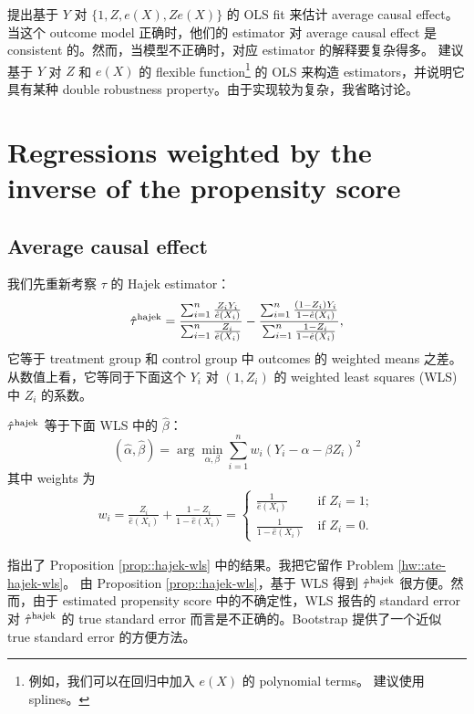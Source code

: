 \citet{rosenbaum1983central} 提出基于 $Y$ 对 $\{1, Z, e(X), Ze(X)\}$ 的 OLS fit 来估计 average causal effect。当这个 outcome model 正确时，他们的 estimator 对 average causal effect 是 consistent 的。然而，当模型不正确时，对应 estimator 的解释要复杂得多。\citet{little2004robust} 建议基于 $Y$ 对 $Z$ 和 $e(X)$ 的 flexible function\footnote{例如，我们可以在回归中加入 $e(X)$ 的 polynomial terms。\citet{little2004robust} 建议使用 splines。} 的 OLS 来构造 estimators，并说明它具有某种 double robustness property。由于实现较为复杂，我省略讨论。



\section{Regressions weighted by the inverse of the propensity score} 


\subsection{Average causal effect}


我们先重新考察 $\tau$ 的 Hajek estimator：
$$
\hat{\tau}^\textup{hajek} = \frac{  \sum_{i=1}^n \frac{Z_i Y_i}{ \hat{e}(X_i) }  }{  \sum_{i=1}^n \frac{Z_i }{ \hat{e}(X_i) } }
- \frac{  \sum_{i=1}^n \frac{ (1-Z_i) Y_i}{ 1 - \hat{e}(X_i) }  }{  \sum_{i=1}^n \frac{ 1-Z_i}{ 1 - \hat{e}(X_i) }  },
$$
它等于 treatment group 和 control group 中 outcomes 的 weighted means 之差。从数值上看，它等同于下面这个 $Y_i$ 对 $(1,Z_i)$ 的 weighted least squares (WLS) 中 $Z_i$ 的系数。


\begin{proposition}
\label{prop::hajek-wls}
$\hat{\tau}^\textup{hajek}$ 等于下面 WLS 中的 $\hat{\beta}$：
$$
(\hat{\alpha}, \hat{\beta}) = \arg\min_{\alpha, \beta} \sum_{i=1}^n w_i(Y_i - \alpha - \beta Z_i)^2
$$
其中 weights 为
\begin{eqnarray}\label{eq::weight-hajek}
w_i =  \frac{Z_i}{   \hat{e}(X_i)  } + \frac{1-Z_i}{ 1-  \hat{e}(X_i) } 
= 
\begin{cases}
\frac{1}{\hat{e}(X_i) } & \text{ if } Z_i=1;\\
\frac{1}{ 1- \hat{e}(X_i) } & \text{ if } Z_i=0.
\end{cases} 
\end{eqnarray}
\end{proposition}

\citet{imbens2004nonparametric} 指出了 Proposition \ref{prop::hajek-wls} 中的结果。我把它留作 Problem \ref{hw::ate-hajek-wls}。
由 Proposition \ref{prop::hajek-wls}，基于 WLS 得到 $\hat{\tau}^\textup{hajek}$ 很方便。然而，由于 estimated propensity score 中的不确定性，WLS 报告的 standard error 对 $\hat{\tau}^\textup{hajek}$ 的 true standard error 而言是不正确的。Bootstrap 提供了一个近似 true standard error 的方便方法。


